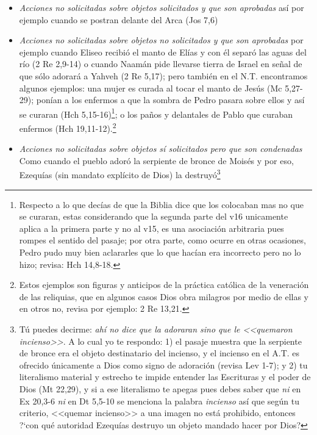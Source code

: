 \documentclass{article}
\begin{document}
\begin{itemize}
\item \emph{Acciones no solicitadas sobre objetos solicitados y que son aprobadas} as\'{i} por ejemplo cuando se postran delante del Arca (Jos 7,6)

\item \emph{Acciones no solicitadas sobre objetos no solicitados y que son aprobadas} por ejemplo cuando Eliseo recibi\'o el manto de El\'{i}as y con \'el separ\'o las aguas del r\'{i}o (2 Re 2,9-14) o cuando Naam\'an pide llevarse tierra de Israel en se\~nal de que s\'olo adorar\'a a Yahveh (2 Re 5,17); pero tambi\'en en el N.T. encontramos algunos ejemplos: una mujer es curada al tocar el manto de Jes\'us (Mc 5,27-29); pon\'{i}an a los enfermos a que la sombra de Pedro pasara sobre ellos y as\'{i} se curaran (Hch 5,15-16)\footnote{Respecto a lo que dec\'{i}as de que la Biblia dice que los colocaban mas no que se curaran, estas considerando que la segunda parte del v16 unicamente aplica a la primera parte y no al v15, es una asociaci\'on arbitraria pues rompes el sentido del pasaje; por otra parte, como ocurre en otras ocasiones, Pedro pudo muy bien aclararles que lo que hac\'{i}an era incorrecto pero no lo hizo; revisa: Hch 14,8-18.}; o los pa\~nos y delantales de Pablo que curaban enfermos (Hch 19,11-12).\footnote{Estos ejemplos son figuras y anticipos de la pr\'actica cat\'olica de la veneraci\'on de las reliquias, que en algunos casos Dios obra milagros por medio de ellas y en otros no, revisa por ejemplo: 2 Re 13,21.}

\item \emph{Acciones no solicitadas sobre objetos s\'{i} solicitados pero que son condenadas} Como cuando el pueblo ador\'o la serpiente de bronce de Mois\'es y por eso, Ezequ\'{i}as (sin mandato expl\'{i}cito de Dios) la destruy\'o\footnote{T\'u puedes decirme: \emph{ah\'{i} no dice que la adoraran sino que le <<quemaron incienso>>}. A lo cual yo te respondo: 1) el pasaje muestra que la serpiente de bronce era el objeto destinatario del incienso, y el incienso en el A.T. es ofrecido \'unicamente a Dios como signo de adoraci\'on (revisa Lev 1-7); y 2) tu literalismo material y estrecho te impide entender las Escrituras y el poder de Dios (Mt 22,29), y si a ese literalismo te apegas pues debes saber que \emph{ni} en Ex 20,3-6 \emph{ni} en Dt 5,5-10 se menciona la palabra \emph{incienso} as\'{i} que seg\'un tu criterio, <<quemar incienso>> a una imagen no est\'a prohibido, entonces ?`con qu\'e autoridad Ezequ\'{i}as destruyo un objeto mandado hacer por Dios?}
\end{itemize}
\end{document}
